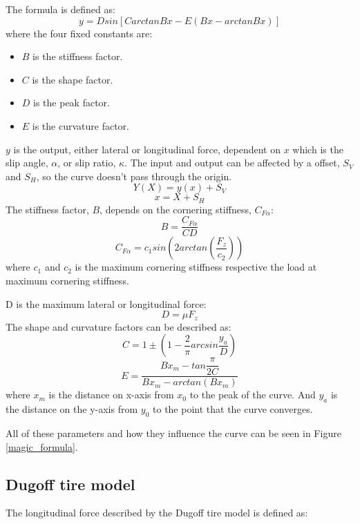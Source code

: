 The formula is defined as:
\begin{equation}
	y = Dsin[CarctanBx-E(Bx-arctanBx)]
\end{equation}
where the four fixed constants are:
\begin{itemize}
	\item $ B $ is the stiffness factor.
	\item $ C $ is the shape factor.
	\item $ D $ is the peak factor.
	\item $ E $ is the curvature factor.
\end{itemize}
$ y $ is the output, either lateral or longitudinal force, dependent on $ x $ which is the slip angle, $ \alpha $, or slip ratio, $ \kappa $. The input and output can be affected by a offset, $ S_{V} $ and $ S_{H} $, so the curve doesn't pass through the origin.
\begin{equation}
	Y(X) = y(x) + S_{V}
\end{equation}
\begin{equation}
	x = X + S_{H}
\end{equation}
The stiffness factor, $ B $, depends on the cornering stiffness, $ C_{F\alpha} $:
\begin{equation}
	B = \dfrac{C_{F\alpha}}{CD}
\end{equation}
\begin{equation}
	C_{F\alpha} = c_{1}sin(2arctan(\dfrac{F_{z}}{c_{2}}))
\end{equation}
where $ c_{1} $ and $ c_{2} $ is the maximum cornering stiffness respective the load at maximum cornering stiffness.

D is the maximum lateral or longitudinal force:
\begin{equation}
	D = \mu F_{z}
\end{equation}
The shape and curvature factors can be described as:
\begin{equation}
	C = 1 \pm (1 - \dfrac{2}{\pi}arcsin\dfrac{y_{a}}{D})
\end{equation}
\begin{equation}
	E = \dfrac{Bx_{m} - tan{\dfrac{\pi}{2C}}}{Bx_{m} - arctan(Bx_{m})}
\end{equation}
where $ x_{m} $ is the distance on x-axis from $ x_{0} $ to the peak of the curve. And $ y_{a} $ is the distance on the y-axis from $ y_{0} $ to the point that the curve converges. 

All of these parameters and how they influence the curve can be seen in Figure \ref{magic_formula}.
\subsection{Dugoff tire model}
The longitudinal force described by the Dugoff tire model is defined as:

